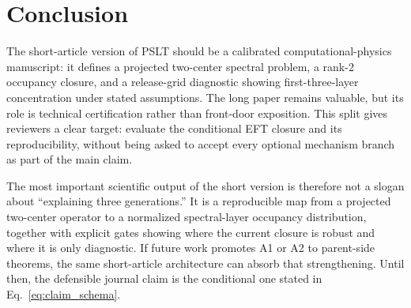 \documentclass[11pt,a4paper]{article}
\begin{document}
\section{Conclusion}
\label{sec:conclusion}

The short-article version of PSLT should be a calibrated computational-physics manuscript: it defines a projected two-center spectral problem, a rank-2 occupancy closure, and a release-grid diagnostic showing first-three-layer concentration under stated assumptions.
The long paper remains valuable, but its role is technical certification rather than front-door exposition.
This split gives reviewers a clear target: evaluate the conditional EFT closure and its reproducibility, without being asked to accept every optional mechanism branch as part of the main claim.

The most important scientific output of the short version is therefore not a slogan about ``explaining three generations.''
It is a reproducible map from a projected two-center operator to a normalized spectral-layer occupancy distribution, together with explicit gates showing where the current closure is robust and where it is only diagnostic.
If future work promotes A1 or A2 to parent-side theorems, the same short-article architecture can absorb that strengthening.
Until then, the defensible journal claim is the conditional one stated in Eq.~\eqref{eq:claim_schema}.



\end{document}
